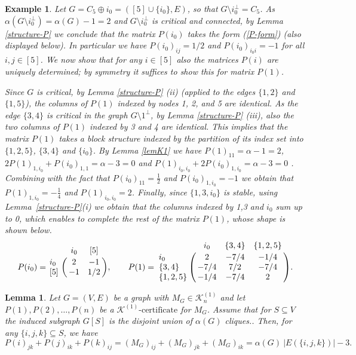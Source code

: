 \documentclass[11pt]{article}
\newcommand{\ignore}[1]{}
\newtheorem{lemma}[theorem]{Lemma}
\newtheorem{example}[theorem]{Example}
\newcommand{\konec}{\MK^{(1)}\text{-certificate}}
\numberwithin{equation}{section}
\newcommand{\MK}{{\mathcal K}}
\begin{document}
\begin{example}
Let $G=C_5\oplus i_0 =([5]\cup\{i_0\},E)$,  so that $G\setminus i_0^\perp=C_5$. As $\alpha(G\setminus i_0^\perp)=\alpha(G)-1=2$ and $G\setminus i_0^\perp$ is critical and connected, by Lemma \ref{structure-P} we conclude that the matrix $P(i_0)$ takes the form (\ref{P-form}) (also displayed below). In particular we have 
$P(i_0)_{ij}=1/2$ and $P(i_0)_{i_0i}=-1$ for all $i,j\in [5]$. We now  show that for any $i\in [5]$ also the matrices $P(i)$ are uniquely determined; by symmetry it suffices to show this for  matrix $P(1)$.

Since $G$ is critical,  by Lemma \ref{structure-P} (ii) (applied to the edges $\{1,2\}$ and $\{1,5\}$),  the columns of $P(1)$ indexed by nodes 1, 2, and 5  are identical. As the edge $\{3,4\}$ is critical in the graph $G\setminus 1^\perp$, by Lemma \ref{structure-P} (iii), also  the two columns of $P(1)$  indexed by 3 and 4  are identical. This implies that the matrix $P(1)$ takes a block structure indexed by the partition of its index set into $\{1,2,5\}$, $\{3,4\}$ and $\{i_0\}$.  By Lemma \ref{lemK1} we have $P(1)_{11}=\alpha-1=2$, $2P(1)_{1,i_0}+P(i_0)_{1,1}=\alpha-3=0$ and $P(1)_{i_0,i_0}+2P(i_0)_{1,i_0}=\alpha-3=0$ .  Combining with  the fact that $P(i_0)_{11}=\frac{1}{2}$ and $P(i_0)_{1,i_0}=-1$ we obtain that  $P(1)_{1,i_0}=-\frac{1}{4}$ and $P(1)_{i_0,i_0}=2$. Finally, since $\{1,3,i_0\}$ is stable, using Lemma~\ref{structure-P}(i) we obtain that the columns indexed by 1,3 and $i_0$ sum up to 0, which enables to complete  the rest of the matrix $P(1)$, whose shape is shown below.
   $$
P(i_0)=\bordermatrix{& i_0 & [5] \cr
i_0 & 2 & -1 \cr
[5]& -1 & 1/2
},
\quad \quad P(1)
=\bordermatrix{
& i_0 & \{3,4\} & \{1,2,5\} \cr
i_0& 2 & -7/4 & -1/4 \cr
\{3,4\}& -7/4  & 7/2 & -7/4 \cr
\{1,2,5\} & -1/4 & -7/4& 2
}.
\ignore{=\left(
\begin{array}{c|c|c}
2 & -\frac{7}{4} & -\frac{1}{4} \\
-\frac{7}{4} &  \frac{7}{2} &
      -\frac{7}{4}\\
    -\frac{1}{4} & -\frac{7}{4} & 2
\end{array}\right) .
}
$$
\end{example}


\begin{lemma}\label{equality-support}
Let $G=(V, E)$ be a graph with $M_G\in \MK_n^{(1)}$ and let $P(1), P(2), \dots, P(n)$ be a $\konec$ for $M_G$. Assume that for $S\subseteq V$ the induced subgraph $G[S]$ is the disjoint union of $\alpha(G)$ cliques.. Then, for any $\{i,j,k\}\subseteq S$, we have 
$$P(i)_{jk}+P(j)_{ik} + P(k)_{ij}= (M_G)_{ij} + (M_G)_{jk} + (M_G)_{ik} = \alpha(G) \ |E(\{i,j,k\})|-3.$$
\end{lemma}
\end{document}
